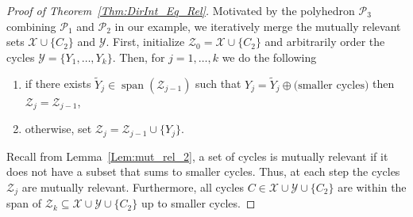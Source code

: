 \documentclass[fleqn,11pt]{article}
\newcommand\calM{\mathcal{M}}
\newcommand\calP{\mathcal{P}}     %
\newcommand\calX{\mathcal{X}}     %
\newcommand\calY{\mathcal{Y}}
\newcommand\calZ{\mathcal{Z}}
\newcommand\expand[2]{\mathcal{E}_{#1}\left(#2\right)}   %
\DeclareMathOperator\Span{span}                         %
\begin{document}
\begin{proof}[Proof of Theorem~\ref{Thm:DirInt_Eq_Rel}]
	
	
	
	Motivated by the polyhedron $\calP_3$ combining $\calP_1$ and $\calP_2$ in our example, we iteratively merge the mutually relevant sets $\calX\cup\{C_2\}$ and $\calY$. 
	First, initialize $\calZ_0=\calX\cup\{C_2\}$ and arbitrarily order the cycles $\calY=\{Y_1,\hdots,Y_k\}$. Then, for $j=1,\hdots,k$ we do the following
	\begin{enumerate}
		\item if there exists $\tilde{Y}_j\in\Span (\calZ_{j-1})$ such that $Y_j=\tilde{Y}_j\oplus\text{(smaller cycles)}$ then $\calZ_{j}=\calZ_{j-1}$,
		\item otherwise, set $\calZ_{j}=\calZ_{j-1}\cup\{Y_{j}\}$.
	\end{enumerate}
	Recall from Lemma~\ref{Lem:mut_rel_2}, a set of cycles is mutually relevant if it does not have a subset that sums to smaller cycles. Thus, at each step the cycles $\calZ_j$ are mutually relevant. Furthermore, all cycles $C\in\calX\cup\calY\cup\{C_2\}$ are within the span of $\calZ_k\subseteq\calX\cup\calY\cup\{C_2\}$ up to smaller cycles.
	

\end{proof}
\end{document}
